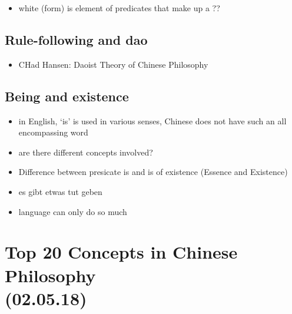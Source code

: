 \documentclass[emulatestandardclasses]{scrartcl}
\begin{document}
\begin{itemize}
  \item white (form) is element of predicates that make up a ??
\end{itemize}


\subsection{Rule-following and dao}

\begin{itemize}
  \item CHad Hansen: Daoist Theory of Chinese Philosophy
\end{itemize}


\subsection{Being and existence}

\begin{itemize}
  \item in English, `is' is used in various senses, Chinese does not have such an all encompassing word
  \item are there different concepts involved?
  \item Difference between presicate is and is of existence (Essence and Existence)
  \item es gibt etwas tut geben
  \item language can only do so much
\end{itemize}


\section{Top 20 Concepts in Chinese Philosophy\\(02.05.18)}
\end{document}
